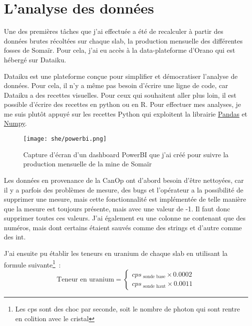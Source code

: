 
\section{L'analyse des données}
Une des premières tâches que j'ai effectuée a été de recalculer à partir des données brutes récoltées sur chaque slab, la production mensuelle des différentes fosses de Somaïr. Pour cela, j'ai eu accès  à la data-plateforme d’Orano qui est hébergé sur Dataiku.

Dataiku est une plateforme conçue pour simplifier et démocratiser l'analyse de données. Pour cela, il n'y a même pas besoin d'écrire une ligne de code, car Dataiku a des recettes visuelles. Pour ceux qui souhaitent aller plus loin, il est possible d'écrire des recettes en python ou en R. Pour effectuer mes analyses, je me suis plutôt appuyé sur les recettes Python qui exploitent la librairie \href{https://pandas.pydata.org/}{Pandas} et \href{https://numpy.org/}{Numpy}.
\begin{figure}
    \centering
    \texttt{[image: she/powerbi.png]}
    \caption[Capture d'ecran d'un dashboard PowerBI]{Capture d'écran d'un dashboard PowerBI que j'ai créé pour suivre la production mensuelle de la mine de Somaïr}
\end{figure}

Les données en provenance de la CanOp ont d'abord besoin d'être nettoyées, car il y a parfois des problèmes de mesure, des bugs et l'opérateur a la possibilité de supprimer une mesure, mais cette fonctionnalité est implémentée de telle manière que la mesure est toujours présente, mais avec une valeur de -1. Il faut donc supprimer toutes ces valeurs. J'ai également eu une colonne ne contenant que des numéros, mais dont certains étaient sauvés comme des strings et d'autre comme des int.

J'ai ensuite pu établir les teneurs en uranium de chaque slab en utilisant la formule suivante\footnote{Les cps sont des choc par seconde, soit le nombre de photon qui sont rentre en colition avec le cristal}~:
\[
    \text{Teneur en uranium} =
    \begin{cases}
        cps_{\text{ sonde base}} \times 0.0002 \\
        cps_{\text{ sonde haut}} \times 0.0011
    \end{cases}
\]


